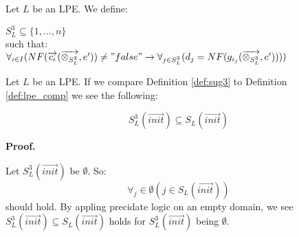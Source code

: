 \documentclass[a4paper,10pt]{article}
\newcommand{\ovr}{\overrightarrow}
\newcommand{\tb}{\textbf}
\begin{document}
\begin{defn} \label{def:sug3} Let $L$ be an LPE. We define:

\begin{flushleft}
$ S_L^3 \subseteq \lbrace 1, \ldots, n \rbrace $ \\

such that:\\

$\forall_{i \in I} (NF( \ovr{c_i} ( \ovr{\otimes_{S_L^3}}, e' ) ) \not= "false" \rightarrow \forall_{j \in S_L^3}(d_j =  NF( g_{i_j}(\ovr{\otimes_{S_L^3}}, e' )))) $
\end{flushleft}
Let $L$ be an LPE. If we compare Definition \ref{def:sug3} to Definition \ref{def:lpe_comp} we see the following:
\begin{lem} \label{lem:sub}
$$S_L^3(\ovr{init}) \subseteq S_L(\ovr{init}) $$
\end{lem} 
\begin{flushleft}
\tb{Proof.}
\end{flushleft}
Let $S_L^3(\ovr{init})$ be $\emptyset$. So: $$\forall_j \in \emptyset ( j \in S_L(\ovr{init}))$$ should hold. By appling precidate logic on an empty domain, we see $S_L^3(\ovr{init}) \subseteq S_L(\ovr{init}) $ holds for $S_L^3(\ovr{init})$ being $\emptyset$. \\


\end{defn}
\end{document}

